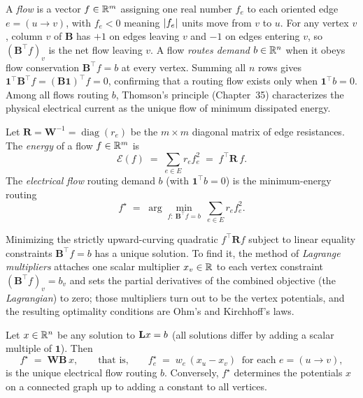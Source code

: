 A \emph{flow} is a vector $f\in\mathbb{R}^m$ assigning one real number $f_e$ to each oriented edge $e=(u\to v)$, with $f_e < 0$ meaning $\lvert f_e\rvert$ units move from $v$ to $u$. For any vertex $v$, column $v$ of $\mathbf{B}$ has $+1$ on edges leaving $v$ and $-1$ on edges entering $v$, so $(\mathbf{B}^\top f)_v$ is the net flow leaving $v$. A flow \emph{routes demand} $b \in \mathbb{R}^n$ when it obeys flow conservation $\mathbf{B}^\top f = b$ at every vertex. Summing all $n$ rows gives $\mathbf{1}^\top \mathbf{B}^\top f = (\mathbf{B}\mathbf{1})^\top f = 0$, confirming that a routing flow exists only when $\mathbf{1}^\top b = 0$. Among all flows routing $b$, Thomson's principle (Chapter~35) characterizes the physical electrical current as the unique flow of minimum dissipated energy.

\begin{definition}\label{ch41:def-elec}
Let $\mathbf{R}=\mathbf{W}^{-1}=\operatorname{diag}(r_e)$ be the $m\times m$ diagonal matrix of edge resistances. The \emph{energy} of a flow $f \in \mathbb{R}^m$ is
\[
  \mathcal{E}(f) \;=\; \sum_{e \in E} r_e f_e^2 \;=\; f^\top \mathbf{R}\, f .
\]
The \emph{electrical flow} routing demand $b$ (with $\mathbf{1}^\top b = 0$) is the minimum-energy routing
\[
  f^\star \;=\; \arg\min_{f:\ \mathbf{B}^\top f = b}\ \sum_{e \in E} r_e f_e^2 .
\]
\end{definition}

Minimizing the strictly upward-curving quadratic $f^\top \mathbf{R} f$ subject to linear equality constraints $\mathbf{B}^\top f = b$ has a unique solution. To find it, the method of \emph{Lagrange multipliers} attaches one scalar multiplier $x_v \in \mathbb{R}$ to each vertex constraint $(\mathbf{B}^\top f)_v = b_v$ and sets the partial derivatives of the combined objective (the \emph{Lagrangian}) to zero; those multipliers turn out to be the vertex potentials, and the resulting optimality conditions are Ohm's and Kirchhoff's laws.

\begin{theorem}[Ohm + Kirchhoff $=$ a Laplacian solve]\label{ch41:thm-ohm}
Let $x \in \mathbb{R}^n$ be any solution to $\mathbf{L} x = b$ (all solutions differ by adding a scalar multiple of $\mathbf{1}$). Then
\[
  f^\star \;=\; \mathbf{W}\mathbf{B}\, x,
  \qquad\text{that is,}\qquad
  f^\star_e \;=\; w_e\,(x_u - x_v)\ \text{ for each } e=(u\to v),
\]
is the unique electrical flow routing $b$. Conversely, $f^\star$ determines the potentials $x$ on a connected graph up to adding a constant to all vertices.
\end{theorem}

